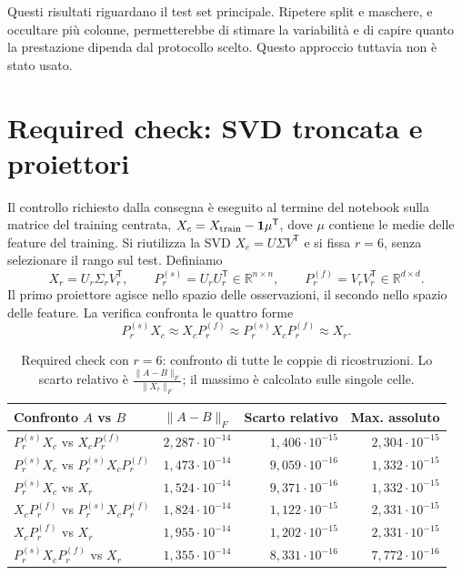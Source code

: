 \documentclass[10pt,a4paper]{article}
\newcommand{\R}{\mathbb R}
\begin{document}
Questi risultati riguardano il test set principale. 
Ripetere split e maschere, e occultare più colonne,
permetterebbe di stimare la variabilità e di capire quanto la
prestazione dipenda dal protocollo scelto. Questo approccio tuttavia non è stato
usato.

\section{Required check: SVD troncata e proiettori}
\label{sec:required-check}
Il controllo richiesto dalla consegna è eseguito al termine del notebook
sulla matrice del training centrata, $X_c=X_{\rm train}-\mathbf{1}\mu^{\mathsf T}$, dove $\mu$ contiene 
le medie delle feature del training.
Si riutilizza la SVD $X_c=U\Sigma V^{\mathsf T}$ e si fissa $r=6$,
senza selezionare il rango sul test. Definiamo
\[
X_r=U_r\Sigma_rV_r^{\mathsf T},\qquad
P_r^{(s)}=U_rU_r^{\mathsf T}\in\R^{n\times n},\qquad
P_r^{(f)}=V_rV_r^{\mathsf T}\in\R^{d\times d}.
\]
Il primo proiettore agisce nello spazio delle osservazioni, il secondo nello
spazio delle feature. La verifica confronta le quattro forme
\[
P_r^{(s)}X_c\approx X_cP_r^{(f)}\approx
P_r^{(s)}X_cP_r^{(f)}\approx X_r.
\]

\begin{table}[H]
\centering\small
\caption{Required check con $r=6$: confronto di tutte le coppie di ricostruzioni.
Lo scarto relativo è $\frac{\|A-B\|_F}{\|X_r\|_F}$; il massimo è calcolato sulle singole celle.}
\label{tab:required-check}
\begin{tabular}{@{}lrrr@{}}
\toprule
Confronto $A$ vs $B$ & $\|A-B\|_F$ & Scarto relativo & Max. assoluto \\
\midrule
$P_r^{(s)}X_c$ vs $X_cP_r^{(f)}$ & $2{,}287\cdot10^{-14}$ & $1{,}406\cdot10^{-15}$ & $2{,}304\cdot10^{-15}$ \\
$P_r^{(s)}X_c$ vs $P_r^{(s)}X_cP_r^{(f)}$ & $1{,}473\cdot10^{-14}$ & $9{,}059\cdot10^{-16}$ & $1{,}332\cdot10^{-15}$ \\
$P_r^{(s)}X_c$ vs $X_r$ & $1{,}524\cdot10^{-14}$ & $9{,}371\cdot10^{-16}$ & $1{,}332\cdot10^{-15}$ \\
$X_cP_r^{(f)}$ vs $P_r^{(s)}X_cP_r^{(f)}$ & $1{,}824\cdot10^{-14}$ & $1{,}122\cdot10^{-15}$ & $2{,}331\cdot10^{-15}$ \\
$X_cP_r^{(f)}$ vs $X_r$ & $1{,}955\cdot10^{-14}$ & $1{,}202\cdot10^{-15}$ & $2{,}331\cdot10^{-15}$ \\
$P_r^{(s)}X_cP_r^{(f)}$ vs $X_r$ & $1{,}355\cdot10^{-14}$ & $8{,}331\cdot10^{-16}$ & $7{,}772\cdot10^{-16}$ \\
\bottomrule
\end{tabular}
\end{table}
\end{document}
